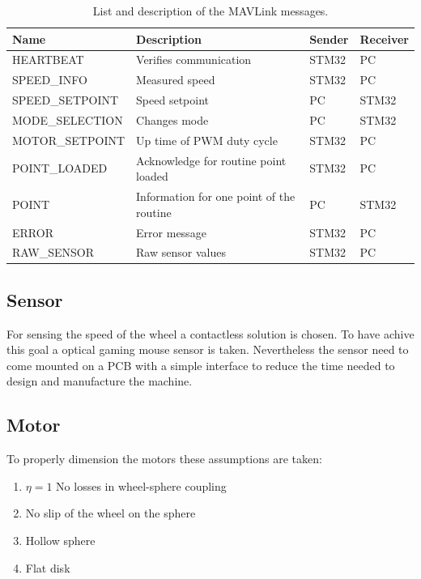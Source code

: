 \documentclass[12pt,a4paper]{article}
\begin{document}
\begin{table}[H]
	\centering
	\begin{tabular}{l||p{3cm}|l|l} 
		\textbf{Name} &\textbf{Description} &\textbf{Sender} &\textbf{Receiver}\\ 
		\hline
		\hline 
		HEARTBEAT &Verifies communication& STM32 & PC \\ 
		\hline 
		SPEED\_INFO &Measured speed  & STM32 & PC \\ 
		\hline 
		SPEED\_SETPOINT & Speed setpoint & PC & STM32 \\ 
		\hline 
		MODE\_SELECTION & Changes mode & PC & STM32  \\ 
		\hline 
		MOTOR\_SETPOINT & Up time of PWM duty cycle & STM32 & PC  \\ 
		\hline 
		POINT\_LOADED & Acknowledge for routine point loaded  & STM32 & PC  \\ 
		\hline 
		POINT & Information for one point of the routine  & PC & STM32  \\  
		\hline 
		ERROR & Error message & STM32 & PC  \\
		\hline
		RAW\_SENSOR & Raw sensor values & STM32 & PC \\
	\end{tabular} 
	\caption{List and description of the MAVLink messages.}
	\label{tab:msg}
\end{table}


\subsection{Sensor}
For sensing the speed of the wheel a contactless solution is chosen. To have achive this goal a optical gaming mouse sensor is taken. Nevertheless the sensor need to come mounted on a PCB with a simple interface to reduce the time needed to design and manufacture the machine. 

\subsection{Motor}
To properly dimension the motors these assumptions are taken:
\begin{enumerate}
	\item $\eta = 1$ No losses in wheel-sphere coupling
	\item No slip of the wheel on the sphere
	\item Hollow sphere
	\item Flat disk
\end{enumerate}
\end{document}
